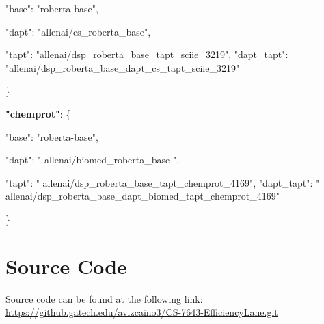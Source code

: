 \documentclass[10pt,twocolumn,letterpaper]{article}
\begin{document}
        "base": "roberta-base",
        
        "dapt": "allenai/cs\_roberta\_base",
        
        "tapt": "allenai/dsp\_roberta\_base\_tapt\_sciie\_3219",
        "dapt\_tapt": 
        "allenai/dsp\_roberta\_base\_dapt\_cs\_tapt\_sciie\_3219"
        
    \}
    
\textbf{"chemprot"}: \{

        "base": "roberta-base",
        
        "dapt": " allenai/biomed\_roberta\_base ",
        
        "tapt": " allenai/dsp\_roberta\_base\_tapt\_chemprot\_4169",
        "dapt\_tapt": " 
        allenai/dsp\_roberta\_base\_dapt\_biomed\_tapt\_chemprot\_4169"
        
    \}
    


\section{Source Code}
Source code can be found at the following link:
\href{https://github.gatech.edu/avizcaino3/CS-7643-EfficiencyLane.git}{https://github.gatech.edu/avizcaino3/CS-7643-EfficiencyLane.git}

{\small


}
\end{document}
